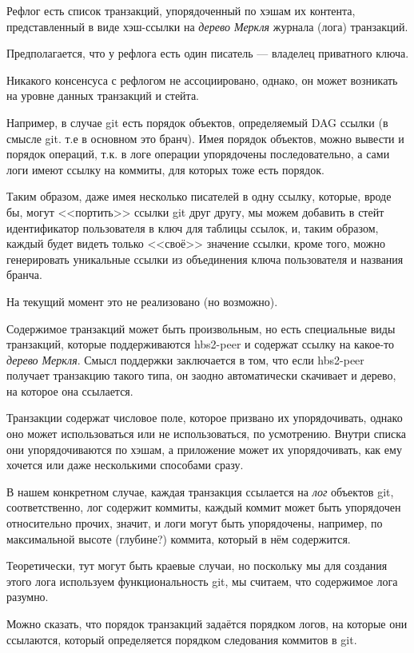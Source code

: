 \documentclass[11pt,a4paper]{article}
\newcommand{\term}[2]{\textit{#2}}
\begin{document}
Рефлог есть список транзакций, упорядоченный по хэшам их контента, представленный в виде хэш-ссылки
на \term{ann-merkle-tree}{дерево Меркля} журнала (лога) транзакций.

Предполагается, что у рефлога есть один писатель --- владелец приватного ключа.

Никакого консенсуса с рефлогом не ассоциировано, однако, он может возникать на уровне данных
транзакций и стейта.

Например, в случае git есть порядок объектов, определяемый DAG ссылки (в смысле git. т.е в основном
это бранч). Имея порядок объектов, можно вывести и порядок операций, т.к. в логе операции
упорядочены последовательно, а сами логи имеют ссылку на коммиты, для которых тоже есть порядок.

Таким образом, даже имея несколько писателей в одну ссылку, которые, вроде бы, могут <<портить>>
ссылки git друг другу, мы можем добавить в стейт идентификатор пользователя в ключ для таблицы
ссылок, и, таким образом, каждый будет видеть только <<своё>> значение ссылки, кроме того, можно
генерировать уникальные ссылки из объединения ключа пользователя и названия бранча.

На текущий момент это не реализовано (но возможно).

Содержимое транзакций может быть произвольным, но есть специальные виды транзакций,
которые поддерживаются hbs2-peer и содержат ссылку на какое-то \term{ann-merkle-tree}{дерево
Меркля}. Смысл поддержки заключается в том, что если hbs2-peer получает транзакцию такого
типа, он заодно автоматически скачивает и дерево, на которое она ссылается.

Транзакции содержат числовое поле, которое призвано их упорядочивать, однако оно может
использоваться или не использоваться, по усмотрению. Внутри списка они упорядочиваются по хэшам, а
приложение может их упорядочивать, как ему хочется или даже несколькими способами сразу.

В нашем конкретном случае, каждая транзакция ссылается на \term{log}{лог} объектов git,
соответственно, лог содержит коммиты, каждый коммит может быть упорядочен относительно прочих,
значит, и логи могут быть упорядочены, например, по максимальной высоте (глубине?) коммита,
который в нём содержится.

Теоретически, тут могут быть краевые случаи, но поскольку мы для создания этого лога
используем функциональность git, мы считаем, что содержимое лога разумно.

Можно сказать, что порядок транзакций задаётся порядком логов, на которые они ссылаются,
который определяется порядком следования коммитов в git.
\end{document}
